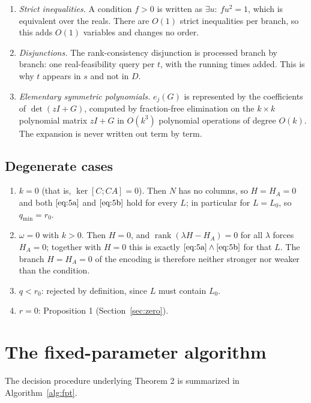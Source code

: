\documentclass[journal]{IEEEtran}
\theoremstyle{plainn}
\theoremstyle{remark}
\begin{document}
\begin{enumerate}
\item \emph{Strict inequalities.} A condition $f>0$ is written as $\exists u:\ fu^2=1$, which is equivalent over the reals. There are $O(1)$ strict inequalities per branch, so this adds $O(1)$ variables and changes no order.
\item \emph{Disjunctions.} The rank-consistency disjunction is processed branch by branch: one real-feasibility query per $t$, with the running times added. This is why $t$ appears in $s$ and not in $D$.
\item \emph{Elementary symmetric polynomials.} $e_j(G)$ is represented by the coefficients of $\det(zI+G)$, computed by fraction-free elimination on the $k\times k$ polynomial matrix $zI+G$ in $O(k^3)$ polynomial operations of degree $O(k)$. The expansion is never written out term by term.
\end{enumerate}
\subsection{Degenerate cases}\label{sec:deg}
\begin{enumerate}
\item \emph{$k=0$} (that is, $\ker[C;CA]=0$). Then $N$ has no columns, so $H=H_A=0$ and both $\eqref{eq:5a}$ and $\eqref{eq:5b}$ hold for every $L$; in particular for $L=L_0$, so $q_{\min}=r_0$.
\item \emph{$\omega=0$} with $k>0$. Then $H=0$, and $\operatorname{rank}(\lambda H-H_A)=0$ for all $\lambda$ forces $H_A=0$; together with $H=0$ this is exactly $\eqref{eq:5a}\wedge\eqref{eq:5b}$ for that $L$. The branch $H=H_A=0$ of the encoding is therefore neither stronger nor weaker than the condition.
\item \emph{$q<r_0$}: rejected by definition, since $L$ must contain $L_0$.
\item \emph{$r=0$}: Proposition 1 (Section~\ref{sec:zero}).
\end{enumerate}

\section{The fixed-parameter algorithm}\label{sec:fpt}
The decision procedure underlying Theorem 2 is summarized in
Algorithm~\ref{alg:fpt}.
\end{document}
